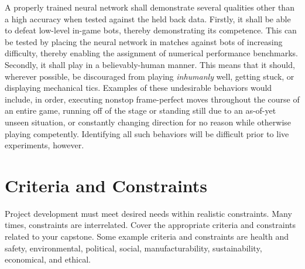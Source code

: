 A properly trained neural network shall demonstrate several qualities other than a high accuracy when tested against the held back data. Firstly, it shall be able to defeat low-level in-game bots, thereby demonstrating its competence. This can be tested by placing the neural network in matches against bots of increasing difficulty, thereby enabling the assignment of numerical performance benchmarks. Secondly, it shall play in a believably-human manner. This means that it should, wherever possible, be discouraged from playing {\it inhumanly} well, getting stuck, or displaying mechanical tics. Examples of these undesirable behaviors would include, in order, executing nonstop frame-perfect moves throughout the course of an entire game, running off of the stage or standing still due to an as-of-yet unseen situation, or constantly changing direction for no reason while otherwise playing competently. Identifying all such behaviors will be difficult prior to live experiments, however.




\section{Criteria and Constraints}

Project development must meet desired needs within realistic constraints. Many times, constraints are interrelated. Cover the appropriate criteria and constraints related to your capstone. Some example criteria and constraints are health and safety, environmental, political, social, manufacturability, sustainability, economical, and ethical.


